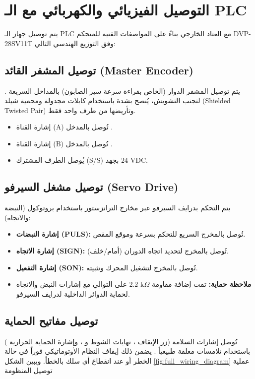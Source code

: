 \section{التوصيل الفيزيائي والكهربائي مع الـ \textenglish{PLC}}
\label{sec:plc_wiring}

يتم توصيل جهاز الـ \textenglish{PLC} مع العتاد الخارجي بناءً على المواصفات الفنية للمتحكم \textenglish{DVP-28SV11T} وفق التوزيع الهندسي التالي:

\subsection{توصيل المشفر القائد (\textenglish{Master Encoder})}
يتم توصيل المشفر الدوار (الخاص بقراءة سرعة سير الصابون) بالمداخل السريعة . لتجنب التشويش، يُنصح بشدة باستخدام كابلات مجدولة ومحمية شيلد (\textenglish{Shielded Twisted Pair}) وتأريضها من طرف واحد فقط.
\begin{itemize}
    \item إشارة القناة (\textenglish{A}) تُوصل بالمدخل .
    \item إشارة القناة (\textenglish{B}) تُوصل بالمدخل .
    \item يُوصل الطرف المشترك (\textenglish{S/S}) بجهد $24\text{ VDC}$.
\end{itemize}

\subsection{توصيل مشغل السيرفو (\textenglish{Servo Drive})}
يتم التحكم بدرايف السيرفو عبر مخارج الترانزستور باستخدام بروتوكول (النبضة والاتجاه):
\begin{itemize}
    \item \textbf{إشارة النبضات (\textenglish{PULS}):} تُوصل بالمخرج السريع  للتحكم بسرعة وموقع المقص.
    \item \textbf{إشارة الاتجاه (\textenglish{SIGN}):} تُوصل بالمخرج  لتحديد اتجاه الدوران (أمام/خلف).
    \item \textbf{إشارة التفعيل (\textenglish{SON}):} تُوصل بالمخرج  لتشغيل المحرك وتثبيته.
    \item \textbf{ملاحظة حماية:} تمت إضافة مقاومة $2.2\text{ k}\Omega$ على التوالي مع إشارات النبض والاتجاه لحماية الدوائر الداخلية لدرايف السيرفو.
\end{itemize}

\subsection{توصيل مفاتيح الحماية}
تُوصل إشارات السلامة (زر الإيقاف ، نهايات الشوط  و ، وإشارة الحماية الحرارية ) باستخدام تلامسات مغلقة طبيعياً . يضمن ذلك إيقاف النظام الأوتوماتيكي فوراً في حالة الخطر أو عند انقطاع أي سلك بالخطأ.
ويبين الشكل \ref{fig:full_wiring_diagram} عملية توصيل المنظومة 
\\

